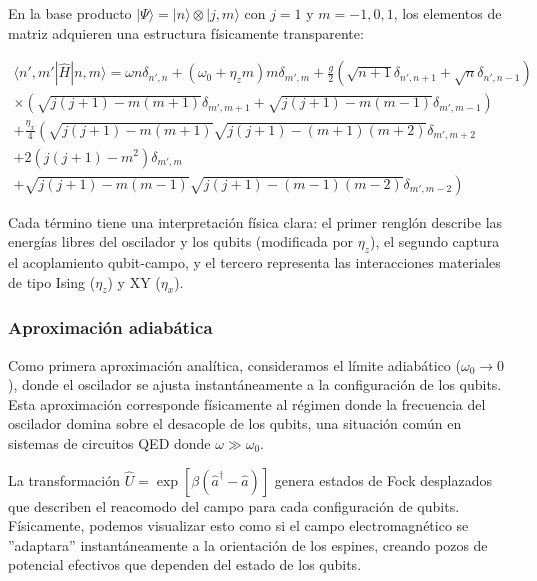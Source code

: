 \documentclass[onecolumn,notitlepage,letterpaper,aps,pra,12pt]{article}
\numberwithin{equation}{section}
\begin{document}
En la base producto $|\Psi\rangle = |n\rangle \otimes |j, m\rangle$ con $j=1$ y $m = -1, 0, 1$, los elementos de matriz adquieren una estructura físicamente transparente:

\small{ 
\begin{gather}
    \langle n', m' | \hat{H} | n, m \rangle 
    = \omega n\delta_{n',n} + \left(\omega_{0} + \eta_{z}m\right) m\delta_{m',m} 
    + \frac{g}{2}\left( \sqrt{n+1}\delta_{n',n+1} + \sqrt{n}\delta_{n',n-1} \right) \nonumber \\
    \times\left(\sqrt{j(j+1) - m(m+1)}\delta_{m',m+1} + \sqrt{j(j+1) - m(m-1)}\delta_{m',m-1}\right) \nonumber \\
    +\frac{\eta_{x}}{4}\left(\sqrt{j(j+1)-m(m+1)}\sqrt{j(j+1)-(m+1)(m+2)}\delta_{m',m+2} \right. \nonumber \\
    \left. +2\left(j(j+1) - m^{2}\right)\delta_{m',m} \right. \nonumber \\
    \left. +\sqrt{j(j+1) - m(m-1)}\sqrt{j(j+1)-(m-1)(m-2)}\delta_{m',m-2}\right) \label{numerica two qubit}
\end{gather}}   

Cada término tiene una interpretación física clara: el primer renglón describe las energías libres del oscilador y los qubits (modificada por $\eta_z$), el segundo captura el acoplamiento qubit-campo, y el tercero representa las interacciones materiales de tipo Ising ($\eta_z$) y XY ($\eta_x$).

\subsubsection{Aproximación adiabática}

Como primera aproximación analítica, consideramos el límite adiabático ($\omega_0 \rightarrow 0$), donde el oscilador se ajusta instantáneamente a la configuración de los qubits. Esta aproximación corresponde físicamente al régimen donde la frecuencia del oscilador domina sobre el desacople de los qubits, una situación común en sistemas de circuitos QED donde $\omega \gg \omega_0$.

La transformación $\hat{U} = \exp\left[{\beta(\hat{a}^{\dagger}-\hat{a})}\right]$ genera estados de Fock desplazados que describen el reacomodo del campo para cada configuración de qubits. Físicamente, podemos visualizar esto como si el campo electromagnético se ''adaptara'' instantáneamente a la orientación de los espines, creando pozos de potencial efectivos que dependen del estado de los qubits.
\end{document}
